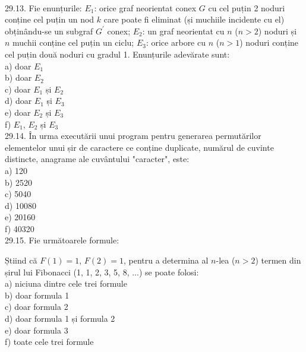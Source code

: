 \begin{itemize}
\\
29.13. Fie enunțurile:
$E_{1}$: orice graf neorientat conex $G$ cu cel puțin 2 noduri conține cel puțin un nod $k$ care poate fi eliminat (și muchiile incidente cu el) obținându-se un subgraf $G^{\prime}$ conex;
$E_{2}$: un graf neorientat cu $n$ ($n>2$) noduri și $n$ muchii conține cel puțin un ciclu;
$E_{3}$: orice arbore cu $n$ ($n>1$) noduri conține cel puțin două noduri cu gradul 1.
Enunțurile adevărate sunt:
\\
a) doar $E_{1}$
\\
b) doar $E_{2}$
\\
c) doar $E_{1}$ și $E_{2}$
\\
d) doar $E_{1}$ și $E_{3}$
\\
e) doar $E_{2}$ și $E_{3}$
\\
f) $E_{1}$, $E_{2}$ și $E_{3}$
\\
29.14. În urma executării unui program pentru generarea permutărilor elementelor unui șir de caractere ce conține duplicate, numărul de cuvinte distincte, anagrame ale cuvântului "caracter", este:
\\
a) 120
\\
b) 2520
\\
c) 5040
\\
d) 10080
\\
e) 20160
\\
f) 40320
\\
29.15. Fie următoarele formule:
\begin{enumerate}
  \item $F(n)=\left{\begin{array}{l}{\left[2 \cdot F\left(\frac{n}{2}-1\right)+F\left(\frac{n}{2}\right)\right] \cdot F\left(\frac{n}{2}\right), \text { n este par, } n>3} \\ {\left[F\left(\frac{n+1}{2}\right)\right]^{2}+\left[F\left(\frac{n-1}{2}\right)\right]^{2} \quad, n \text { este impar, } n>2}\end{array}\right.$
  \item $F(n)=\frac{1}{\sqrt{5}} \cdot\left(\frac{1+\sqrt{5}}{2}\right)^{n}+\frac{1}{\sqrt{5}} \cdot\left(\frac{1-\sqrt{5}}{2}\right)^{n}$
  \item $F(n)=\frac{1}{\sqrt{5}} \cdot\left(\frac{1+\sqrt{5}}{2}\right)^{n / 2}+\frac{1}{\sqrt{5}} \cdot\left(\frac{1-\sqrt{5}}{2}\right)^{n / 2}$
\end{enumerate}
Știind că $F(1)=1$, $F(2)=1$, pentru a determina al $n$-lea ($n>2$) termen din șirul lui Fibonacci (1, 1, 2, 3, 5, 8, ...) se poate folosi:
\\
a) niciuna dintre cele trei formule
\\
b) doar formula 1
\\
c) doar formula 2
\\
d) doar formula 1 și formula 2
\\
e) doar formula 3
\\
f) toate cele trei formule
\\


\end{itemize}
